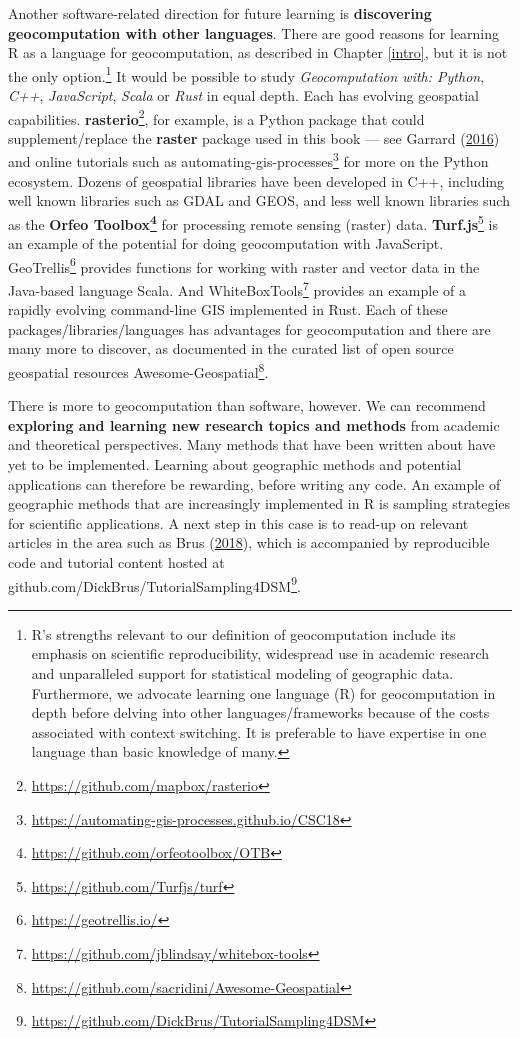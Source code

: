 \documentclass[]{krantz}
\let\rmarkdownfootnote\footnote%
\def\footnote{\protect\rmarkdownfootnote}
\renewcommand{\href}[2]{#2\footnote{\url{#1}}}
\begin{document}
Another software-related direction for future learning is \textbf{discovering geocomputation with other languages}.
There are good reasons for learning R as a language for geocomputation, as described in Chapter \ref{intro}, but it is not the only option.\footnote{R's strengths relevant to our definition of geocomputation include its emphasis on scientific reproducibility, widespread use in academic research and unparalleled support for statistical modeling of geographic data.
  Furthermore, we advocate learning one language (R) for geocomputation in depth before delving into other languages/frameworks because of the costs associated with context switching.
  It is preferable to have expertise in one language than basic knowledge of many.}
It would be possible to study \emph{Geocomputation with: Python}, \emph{C++}, \emph{JavaScript}, \emph{Scala} or \emph{Rust} in equal depth.
Each has evolving geospatial capabilities.
\href{https://github.com/mapbox/rasterio}{\textbf{rasterio}}, for example, is a Python package
that could supplement/replace the \textbf{raster} package used in this book --- see Garrard (\protect\hyperlink{ref-garrard_geoprocessing_2016}{2016}) and online tutorials such as \href{https://automating-gis-processes.github.io/CSC18}{automating-gis-processes} for more on the Python ecosystem.
Dozens of geospatial libraries have been developed in C++, including well known libraries such as GDAL and GEOS, and less well known libraries such as the \textbf{\href{https://github.com/orfeotoolbox/OTB}{Orfeo Toolbox}} for processing remote sensing (raster) data.
\href{https://github.com/Turfjs/turf}{\textbf{Turf.js}} is an example of the potential for doing geocomputation with JavaScript.
\href{https://geotrellis.io/}{GeoTrellis} provides functions for working with raster and vector data in the Java-based language Scala.
And \href{https://github.com/jblindsay/whitebox-tools}{WhiteBoxTools} provides an example of a rapidly evolving command-line GIS implemented in Rust.
Each of these packages/libraries/languages has advantages for geocomputation and there are many more to discover, as documented in the curated list of open source geospatial resources \href{https://github.com/sacridini/Awesome-Geospatial}{Awesome-Geospatial}.

There is more to geocomputation than software, however.
We can recommend \textbf{exploring and learning new research topics and methods} from academic and theoretical perspectives.
Many methods that have been written about have yet to be implemented.
Learning about geographic methods and potential applications can therefore be rewarding, before writing any code.
An example of geographic methods that are increasingly implemented in R is sampling strategies for scientific applications.
A next step in this case is to read-up on relevant articles in the area such as Brus (\protect\hyperlink{ref-brus_sampling_2018}{2018}), which is accompanied by reproducible code and tutorial content hosted at \href{https://github.com/DickBrus/TutorialSampling4DSM}{github.com/DickBrus/TutorialSampling4DSM}.
\end{document}
